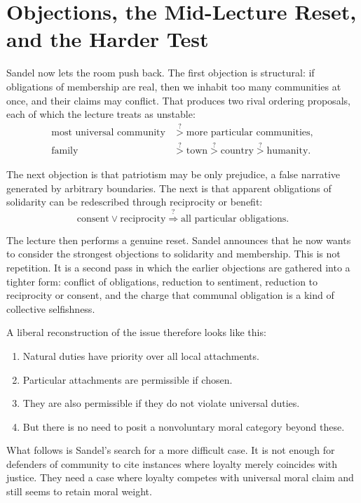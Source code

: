 \section{Objections, the Mid-Lecture Reset, and the Harder Test}

Sandel now lets the room push back. The first objection is structural: if obligations of membership are real, then we inhabit too many communities at once, and their claims may conflict. That produces two rival ordering proposals, each of which the lecture treats as unstable:
\begin{align}
\text{most universal community} &\stackrel{?}{>} \text{more particular communities}, \\
\text{family} &\stackrel{?}{>} \text{town} \stackrel{?}{>} \text{country} \stackrel{?}{>} \text{humanity}.
\end{align}

The next objection is that patriotism may be only prejudice, a false narrative generated by arbitrary boundaries. The next is that apparent obligations of solidarity can be redescribed through reciprocity or benefit:
\begin{equation}
\text{consent} \lor \text{reciprocity} \stackrel{?}{\Longrightarrow} \text{all particular obligations}.
\end{equation}

The lecture then performs a genuine reset. Sandel announces that he now wants to consider the strongest objections to solidarity and membership. This is not repetition. It is a second pass in which the earlier objections are gathered into a tighter form: conflict of obligations, reduction to sentiment, reduction to reciprocity or consent, and the charge that communal obligation is a kind of collective selfishness.

A liberal reconstruction of the issue therefore looks like this:
\begin{enumerate}
\item Natural duties have priority over all local attachments.
\item Particular attachments are permissible if chosen.
\item They are also permissible if they do not violate universal duties.
\item But there is no need to posit a nonvoluntary moral category beyond these.
\end{enumerate}

What follows is Sandel's search for a more difficult case. It is not enough for defenders of community to cite instances where loyalty merely coincides with justice. They need a case where loyalty competes with universal moral claim and still seems to retain moral weight.

